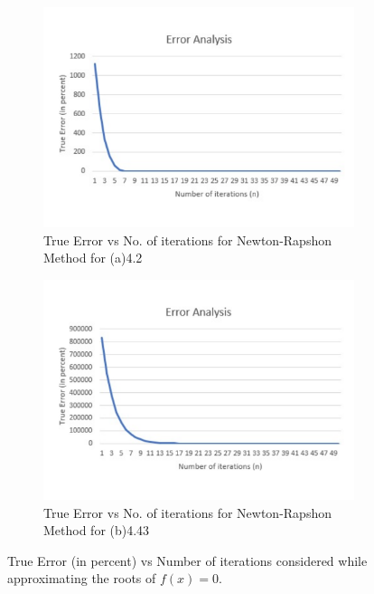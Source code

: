 \documentclass[titlepage, 11pt]{article}
\begin{document}
\begin{figure}[ht]
\begin{subfigure}{.5\textwidth}
  \centering
  \includegraphics[width=\linewidth]{TE2a.pdf}
  \caption{True Error vs No. of iterations for Newton-Rapshon Method for (a)4.2}
  \label{fig:fig84a}
\end{subfigure}
\begin{subfigure}{.5\textwidth}
  \centering
  \includegraphics[width=\linewidth]{TE2b.pdf}
  \caption{True Error vs No. of iterations for Newton-Rapshon Method for (b)4.43}
  \label{fig:fig84b}
\end{subfigure}
\caption{True Error (in percent) vs Number of iterations considered while approximating the roots of $f(x)=0$.}
\label{fig:q82}
\end{figure}
\end{document}
